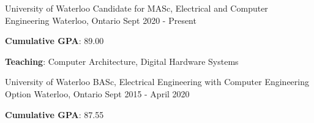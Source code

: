 

\begin{cventries}

    \cventry
    {University of Waterloo} %
    {Candidate for MASc, Electrical and Computer Engineering} %
    {Waterloo, Ontario} %
    {Sept 2020 - Present} %
    {
      \begin{cvitems} %
        \item \textbf{Cumulative GPA}: 89.00
        \item \textbf{Teaching}: Computer Architecture, Digital Hardware Systems
      \end{cvitems}
    }
  
  \cventry
    {University of Waterloo} %
    {BASc, Electrical Engineering with Computer Engineering Option} %
    {Waterloo, Ontario} %
    {Sept 2015 - April 2020} %
    {
      \begin{cvitems} %
        \item \textbf{Cumulative GPA}: 87.55
      \end{cvitems}
    }

\end{cventries}
